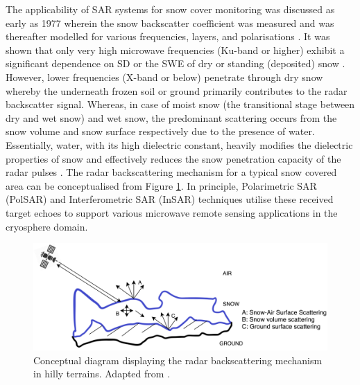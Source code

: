 \documentclass[12pt]{elsarticle}
\numberwithin{equation}{section}
\numberwithin{figure}{section}
\numberwithin{table}{section}
\begin{document}
The applicability of SAR systems for snow cover monitoring was discussed as early as 1977 \citep{Ulaby1977} wherein the snow backscatter coefficient was measured and was thereafter modelled for various frequencies, layers, and polarisations \citep{Zuniga1979}. It was shown that only very high microwave frequencies (Ku-band or higher) exhibit a significant dependence on SD or the SWE of dry or standing (deposited) snow \citep{Yueh2009}. However, lower frequencies (X-band or below) penetrate through dry snow whereby the underneath frozen soil or ground primarily contributes to the radar backscatter signal. Whereas, in case of moist snow (the transitional stage between dry and wet snow) and wet snow, the predominant scattering occurs from the snow volume and snow surface respectively due to the presence of water. Essentially, water, with its high dielectric constant, heavily modifies the dielectric properties of snow and effectively reduces the snow penetration capacity of the radar pulses \citep{Abe1990}. The radar backscattering mechanism for a typical snow covered area can be conceptualised from Figure \ref{fig:concept}. In principle, Polarimetric SAR (PolSAR) and Interferometric SAR (InSAR) techniques utilise these received target echoes to support various microwave remote sensing applications in the cryosphere domain.

\begin{figure}[htb]
    \centering
    \includegraphics[width=\textwidth]{Figures/Conceptual.png}
    \caption{\doublespacing Conceptual diagram displaying the radar backscattering mechanism in hilly terrains. Adapted from \cite{Thakur2012}.}
    \label{fig:concept}
\end{figure}
\end{document}
